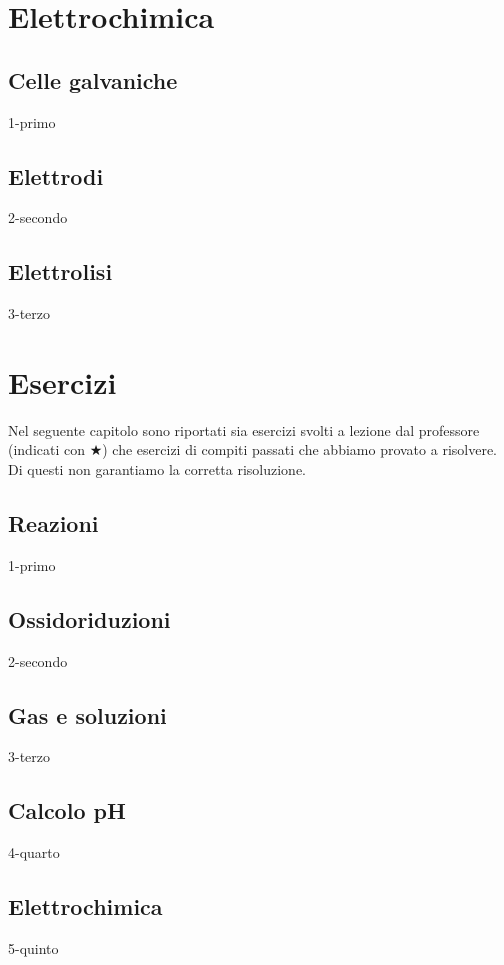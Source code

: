 \documentclass[openany,12pt]{book}%
\newcommand\blankpage{%
    \null
    \thispagestyle{empty}%
    \newpage}
\begin{document}
\chapter{Elettrochimica}

\section{Celle galvaniche}
{1-primo}

\section{Elettrodi}
{2-secondo}

\section{Elettrolisi}
{3-terzo}


\afterpage{\blankpage}
\newpage

\appendix

\chapter{Esercizi}

Nel seguente capitolo sono riportati sia esercizi svolti a lezione dal professore (indicati con $\bigstar$) che esercizi di compiti passati che abbiamo provato a risolvere. Di questi non garantiamo la corretta risoluzione.

\section{Reazioni}
{1-primo}

\newpage

\section{Ossidoriduzioni}
{2-secondo}

\newpage

\section{Gas e soluzioni}
{3-terzo}

\newpage

\section{Calcolo pH}
{4-quarto}

\newpage

\section{Elettrochimica}
{5-quinto}
\end{document}
